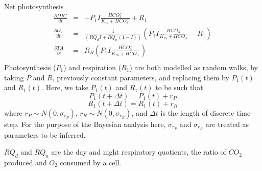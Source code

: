 \documentclass{ruthesis}
\begin{document}
Net photosynthesis
\begin{align}
\frac{\partial DIC}{dt} &=&  -P_1 I \frac{HCO_3^-}{K_m + HCO_3^-}  + R_1 
\\
\frac{\partial O_2}{dt}	&=&  \frac{1}{(RQ_d I + RQ_n(1-I))}(P_1 I \frac{HCO_3^-}{K_m + HCO_3^-}  - R_1)
\\
\frac{\partial TA}{\partial t}  &=&      R_R (P_1 I \frac{HCO_3^-}{K_m + HCO_3^-})
\\
\end{align}
Photosynthesis ($P_1$) and respiration ($R_1$) are both modelled as random walks, by taking \begin{math}P\end{math} and \begin{math}R\end{math}, previously constant parameters, and replacing them by \begin{math}P_1(t)\end{math} and \begin{math}R_1(t)\end{math}. Here, we take \begin{math}P_1(t)\end{math} and \begin{math}R_1(t)\end{math} to be such that
\begin{displaymath}
P_1(t+\Delta t) = P_1(t) + r_P
\end{displaymath}
\begin{displaymath}
R_1(t+\Delta t) = R_1(t) + r_R
\end{displaymath}
where \begin{math}
r_P \sim N(0, \sigma_{r_P})
\end{math}, \begin{math}
r_R \sim N(0, \sigma_{r_R})
\end{math}, and \begin{math}
\Delta t
\end{math} is the length of discrete time-step. For the purpose of the Bayesian analysis here, \begin{math}\sigma_{r_P}\end{math} and \begin{math}\sigma_{r_R}\end{math} are treated as parameters to be inferred. 


$RQ_d$ and $RQ_n$ are the day and night respiratory quotients, the ratio of $CO_2$ produced and $O_2$ consumed by a cell. 
\end{document}
